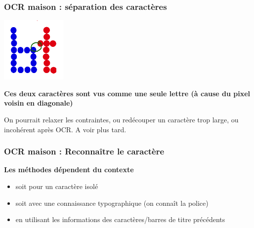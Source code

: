 \documentclass[xcolor=dvipsnames]{beamer}
\begin{document}
\begin{frame}
\frametitle{OCR maison : séparation des caractères }
    \begin{center}
       \includegraphics[width=120px]{9x9_bt_conflit.png}
    \end{center}
      \begin{alertblock}{}
            \begin{center}
                  \textbf{\Large Ces deux caractères sont vus comme une seule lettre (à cause du pixel voisin en diagonale)}
            \end{center}
      \end{alertblock}
\pause
On pourrait relaxer les contraintes, ou redécouper un caractère trop large, ou incohérent après OCR\pause.
A voir plus tard.

\end{frame}

\begin{frame}
\frametitle{OCR maison : Reconnaître le caractère }
      \begin{alertblock}{}
            \begin{center}
                  \textbf{\Large Les méthodes dépendent du contexte}\pause
            \end{center}
      \end{alertblock}
      \begin{itemize}
            \item soit pour un caractère isolé\pause
            \item soit avec une connaissance typographique \pause (on connaît la police)\pause
            \item en utilisant les informations des caractères/barres de titre précédents
      \end{itemize}
\end{frame}
\end{document}
